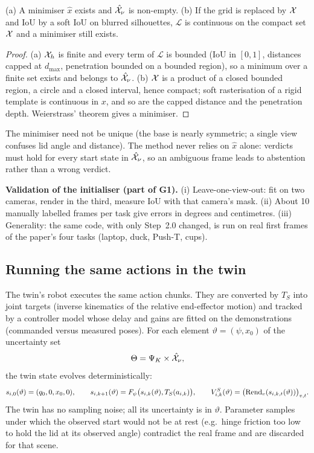 \begin{proposition}\label{method:prop:fit}
(a) A minimiser $\hat x$ exists and $\hat{\mathcal X}_\nu$ is non-empty. (b) If the grid is replaced by $\mathcal X$ and IoU by a soft IoU on blurred silhouettes, $\mathcal L$ is continuous on the compact set $\mathcal X$ and a minimiser still exists.
\end{proposition}
\begin{proof}
(a) $\mathcal X_h$ is finite and every term of $\mathcal L$ is bounded (IoU in $[0,1]$, distances capped at $d_{\max}$, penetration bounded on a bounded region), so a minimum over a finite set exists and belongs to $\hat{\mathcal X}_\nu$. (b) $\mathcal X$ is a product of a closed bounded region, a circle and a closed interval, hence compact; soft rasterisation of a rigid template is continuous in $x$, and so are the capped distance and the penetration depth. Weierstrass' theorem gives a minimiser.
\end{proof}
\begin{remark}
The minimiser need not be unique (the base is nearly symmetric; a single view confuses lid angle and distance). The method never relies on $\hat x$ alone: verdicts must hold for every start state in $\hat{\mathcal X}_\nu$, so an ambiguous frame leads to abstention rather than a wrong verdict.
\end{remark}

\textbf{Validation of the initialiser (part of G1).} (i) Leave-one-view-out: fit on two cameras, render in the third, measure IoU with that camera's mask. (ii) About 10 manually labelled frames per task give errors in degrees and centimetres. (iii) Generality: the same code, with only Step~2.0 changed, is run on real first frames of the paper's four tasks (laptop, duck, Push-T, cups).

\subsection{Running the same actions in the twin}\label{method:sec:dyn}
The twin's robot executes the same action chunks. They are converted by $T_S$ into joint targets (inverse kinematics of the relative end-effector motion) and tracked by a controller model whose delay and gains are fitted on the demonstrations (commanded versus measured poses). For each element $\vartheta=(\psi,x_0)$ of the uncertainty set
\begin{equation}
\Theta=\Psi_K\times\hat{\mathcal X}_\nu,
\end{equation}
the twin state evolves deterministically:
\begin{equation}
s_{i,0}(\vartheta)=(q_0,0,x_0,0),\qquad s_{i,k+1}(\vartheta)=F_\psi\big(s_{i,k}(\vartheta),T_S(a_{i,k})\big),\qquad V^{S}_{i,k}(\vartheta)=\big(\mathrm{Rend}_v(s_{i,k,t}(\vartheta))\big)_{v,t}.
\end{equation}
The twin has no sampling noise; all its uncertainty is in $\vartheta$. Parameter samples under which the observed start would not be at rest (e.g.\ hinge friction too low to hold the lid at its observed angle) contradict the real frame and are discarded for that scene.

